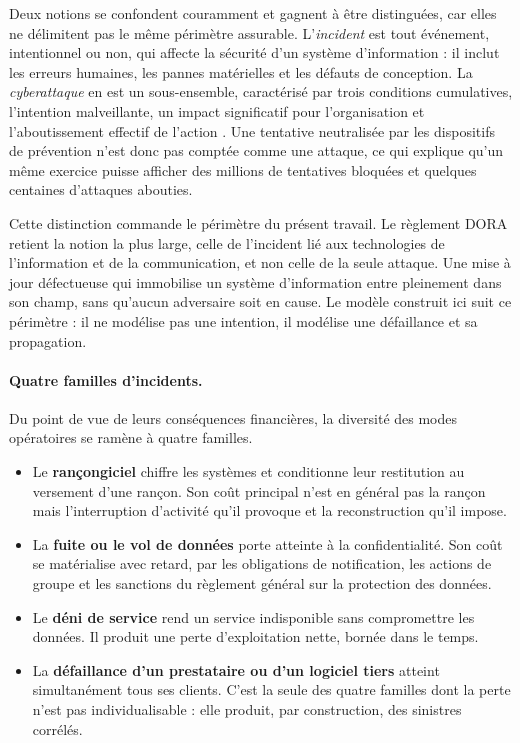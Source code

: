 Deux notions se confondent couramment et gagnent à être distinguées, car elles ne délimitent
pas le même périmètre assurable. L'\emph{incident} est tout événement, intentionnel ou non, qui
affecte la sécurité d'un système d'information : il inclut les erreurs humaines, les pannes
matérielles et les défauts de conception. La \emph{cyberattaque} en est un sous-ensemble,
caractérisé par trois conditions cumulatives, l'intention malveillante, un impact significatif
pour l'organisation et l'aboutissement effectif de l'action \citep{cesin2026}. Une tentative
neutralisée par les dispositifs de prévention n'est donc pas comptée comme une attaque, ce qui
explique qu'un même exercice puisse afficher des millions de tentatives bloquées et quelques
centaines d'attaques abouties.

Cette distinction commande le périmètre du présent travail. Le règlement DORA retient la notion
la plus large, celle de l'incident lié aux technologies de l'information et de la communication,
et non celle de la seule attaque. Une mise à jour défectueuse qui immobilise un système
d'information entre pleinement dans son champ, sans qu'aucun adversaire soit en cause. Le modèle
construit ici suit ce périmètre : il ne modélise pas une intention, il modélise une défaillance
et sa propagation.

\paragraph{Quatre familles d'incidents.} Du point de vue de leurs conséquences financières, la
diversité des modes opératoires se ramène à quatre familles.

\begin{itemize}[leftmargin=1.4em,itemsep=3pt]
\item Le \textbf{rançongiciel} chiffre les systèmes et conditionne leur restitution au versement
      d'une rançon. Son coût principal n'est en général pas la rançon mais l'interruption
      d'activité qu'il provoque et la reconstruction qu'il impose.
\item La \textbf{fuite ou le vol de données} porte atteinte à la confidentialité. Son coût se
      matérialise avec retard, par les obligations de notification, les actions de groupe et les
      sanctions du règlement général sur la protection des données.
\item Le \textbf{déni de service} rend un service indisponible sans compromettre les données. Il
      produit une perte d'exploitation nette, bornée dans le temps.
\item La \textbf{défaillance d'un prestataire ou d'un logiciel tiers} atteint simultanément tous
      ses clients. C'est la seule des quatre familles dont la perte n'est pas individualisable :
      elle produit, par construction, des sinistres corrélés.
\end{itemize}

